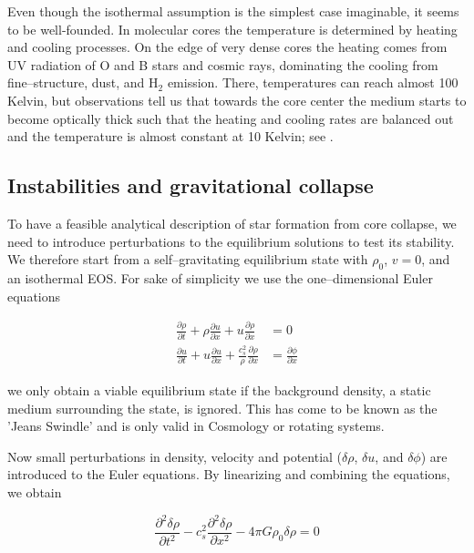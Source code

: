 Even though the isothermal assumption is the simplest case imaginable, it seems to be well-founded.
In molecular cores the temperature is determined by heating and cooling processes.
On the edge of very dense cores the heating comes from UV radiation of O and B stars and cosmic rays, dominating the cooling from fine--structure, dust, and H$_{2}$ emission.
There, temperatures can reach almost 100 Kelvin, but observations tell us that towards the core center the medium starts to become optically thick such that the heating and cooling rates are balanced out and the temperature is almost constant at 10 Kelvin; see \citet{Goldsmith_cooling, Wolfire_10K}.

\subsection{Instabilities and gravitational collapse}
\label{subsec:Instabilities}

To have a feasible analytical description of star formation from core collapse, we need to introduce perturbations to the equilibrium solutions to test its stability.
We therefore start from a self--gravitating equilibrium state with $\rho_{0}$, $v=0$, and an isothermal EOS.
For sake of simplicity we use the one--dimensional Euler equations

\begin{align}
  \frac{\partial\rho}{\partial t} + \rho\frac{\partial u}{\partial x} + u\frac{\partial\rho}{\partial x} &= 0 \\
  \frac{\partial u}{\partial t} + u\frac{\partial u}{\partial x} + \frac{c_{s}^{2}}{\rho}\frac{\partial\rho}{\partial x} &= \frac{\partial\phi}{\partial x}
\end{align}

we only obtain a viable equilibrium state if the background density, a static medium surrounding the state, is ignored.
This has come to be known as the 'Jeans Swindle' and is only valid in Cosmology or rotating systems.

Now small perturbations in density, velocity and potential ($\delta\rho$, $\delta u$, and $\delta\phi$) are introduced to the Euler equations.
By linearizing and combining the equations, we obtain

\begin{equation}
  \frac{\partial^{2}\delta\rho}{\partial t^{2}} - c_{s}^{2}\frac{\partial^{2}\delta\rho}{\partial x^{2}} - 4\pi G\rho_{0}\delta\rho = 0
\end{equation}

